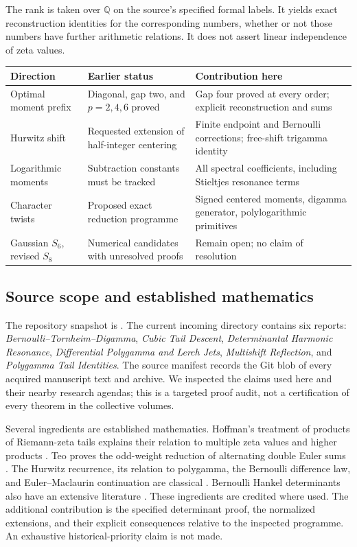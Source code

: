 \documentclass[11pt]{article}
\theoremstyle{definition}
\theoremstyle{remark}
\numberwithin{equation}{section}
\newcommand{\Q}{\mathbb Q}
\begin{document}
The rank is taken over $\Q$ on the source's specified formal labels.
It yields exact reconstruction identities for the corresponding
numbers, whether or not those numbers have further arithmetic
relations. It does not assert linear independence of zeta values.

\begin{center}
\begin{tabular}{@{}>{\raggedright\arraybackslash}p{}>{\raggedright\arraybackslash}p{}>{\raggedright\arraybackslash}p{}@{}}
\toprule
Direction & Earlier status & Contribution here \\
\midrule
Optimal moment prefix & Diagonal, gap two, and $p=2,4,6$ proved &
Gap four proved at every order; explicit reconstruction and sums \\
Hurwitz shift & Requested extension of half-integer centering &
Finite endpoint and Bernoulli corrections; free-shift trigamma identity \\
Logarithmic moments & Subtraction constants must be tracked &
All spectral coefficients, including Stieltjes resonance terms \\
Character twists & Proposed exact reduction programme &
Signed centered moments, digamma generator, polylogarithmic primitives \\
Gaussian $S_6$, revised $S_8$ & Numerical candidates with unresolved proofs &
Remain open; no claim of resolution \\
\bottomrule
\end{tabular}
\end{center}

\subsection{Source scope and established mathematics}

The repository snapshot is \cite{Repo}. The current incoming directory
contains six reports: \emph{Bernoulli--Tornheim--Digamma},
\emph{Cubic Tail Descent}, \emph{Determinantal Harmonic Resonance},
\emph{Differential Polygamma and Lerch Jets},
\emph{Multishift Reflection}, and \emph{Polygamma Tail Identities}.
The source manifest records the Git blob of every acquired manuscript
text and archive. We inspected the claims used here and their nearby
research agendas; this is a targeted proof audit, not a certification
of every theorem in the collective volumes.

Several ingredients are established mathematics. Hoffman's treatment
of products of Riemann-zeta tails explains their relation to multiple
zeta values and higher products \cite{Hoffman}. Teo proves the
odd-weight reduction of alternating double Euler sums \cite{Teo}.
The Hurwitz recurrence, its relation to polygamma, the Bernoulli
difference law, and Euler--Maclaurin continuation are classical
\cite{DLMF}. Bernoulli Hankel determinants also have an extensive
literature \cite{DilcherJiu}. These ingredients are credited where
used. The additional contribution is the specified determinant proof,
the normalized extensions, and their explicit consequences relative
to the inspected programme. An exhaustive historical-priority claim
is not made.
\end{document}
